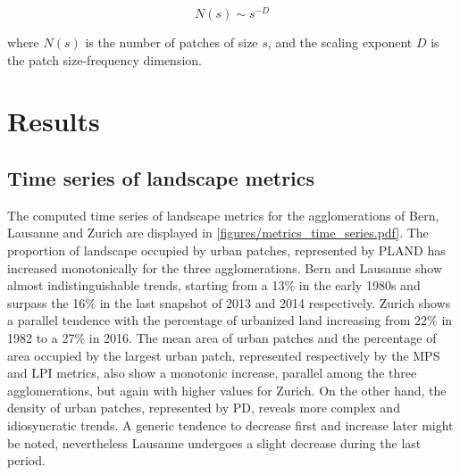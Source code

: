 \documentclass[10pt,letterpaper]{article}
\begin{document}
\begin{equation}
  \label{eq:radial-dimension}
  N(s) \sim s^{-D}
\end{equation}

where $N(s)$ is the number of patches of size $s$, and the scaling exponent $D$ is the patch size-frequency dimension.


\section*{Results}

\subsection*{Time series of landscape metrics}

The computed time series of landscape metrics for the agglomerations of Bern, Lausanne and Zurich are displayed in \autoref{figures/metrics_time_series.pdf}.
The proportion of landscape occupied by urban patches, represented by PLAND has increased monotonically for the three agglomerations. Bern and Lausanne show almost indistinguishable trends, starting from a 13$\%$ in the early 1980s and surpass the 16$\%$ in the last snapshot of 2013 and 2014 respectively. Zurich shows a parallel tendence with the percentage of urbanized land increasing from 22$\%$ in 1982 to a 27$\%$ in 2016.
The mean area of urban patches and the percentage of area occupied by the largest urban patch, represented respectively by the MPS and LPI metrics, also show a monotonic increase, parallel among the three agglomerations, but again with higher values for Zurich. %
On the other hand, the density of urban patches, represented by PD, reveals more complex and idiosyncratic trends. %
A generic tendence to decrease first and increase later might be noted, nevertheless Lausanne undergoes a slight decrease during the last period. 
\end{document}
